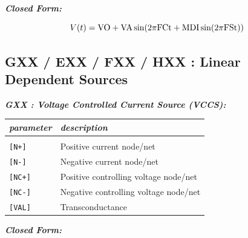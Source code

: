 \textbf{\textit{Closed Form:}}

  \[
    V(t)=\rm{VO}+\rm{VA}\sin(2\pi\rm{FC}t+\rm{MDI\sin(2\pi\rm{FS}t)}) \nonumber
  \]

%
%
%
%
\newpage
\subsection{GXX / EXX / FXX / HXX : Linear Dependent Sources}
\label{subsec_sceadm_lineardependentsources}

\textbf{\textit{GXX : Voltage Controlled Current Source (VCCS):}}


\begin{longtable}{l l}
\textit{parameter} & \textit{description} \\ \hline \\ \vspace{-0.8\parskip}
\texttt{[N+]} & Positive current node/net \\
\texttt{[N-]} & Negative current node/net \\
\texttt{[NC+]} & Positive controlling voltage node/net \\
\texttt{[NC-]} & Negative controlling voltage node/net \\
\texttt{[VAL]} & Transconductance
\end{longtable}

\textbf{\textit{Closed Form:}}


